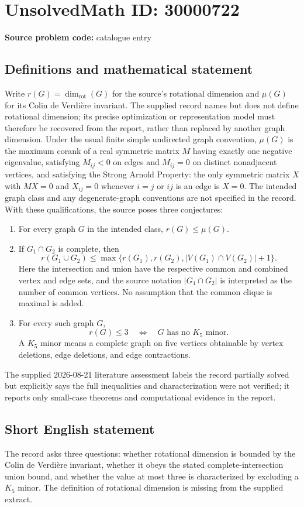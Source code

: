 \documentclass[11pt]{article}
\begin{document}
\section*{UnsolvedMath ID: 30000722}
\textbf{Source problem code:} catalogue entry
\subsection{Definitions and mathematical statement}
Write $r(G)=\operatorname{dim}_{\mathrm{rot}}(G)$ for the source's rotational dimension and $\mu(G)$ for its Colin de Verdi\`ere invariant. The supplied record names but does not define rotational dimension; its precise optimization or representation model must therefore be recovered from the report, rather than replaced by another graph dimension. Under the usual finite simple undirected graph convention, $\mu(G)$ is the maximum corank of a real symmetric matrix $M$ having exactly one negative eigenvalue, satisfying $M_{ij}<0$ on edges and $M_{ij}=0$ on distinct nonadjacent vertices, and satisfying the Strong Arnold Property: the only symmetric matrix $X$ with $MX=0$ and $X_{ij}=0$ whenever $i=j$ or $ij$ is an edge is $X=0$. The intended graph class and any degenerate-graph conventions are not specified in the record. With these qualifications, the source poses three conjectures: \begin{enumerate}\item For every graph $G$ in the intended class, $r(G)\leq\mu(G)$.\item If $G_1\cap G_2$ is complete, then \[r(G_1\cup G_2)\leq\max\{r(G_1),r(G_2),|V(G_1)\cap V(G_2)|+1\}.\] Here the intersection and union have the respective common and combined vertex and edge sets, and the source notation $|G_1\cap G_2|$ is interpreted as the number of common vertices. No assumption that the common clique is maximal is added.\item For every such graph $G$, \[r(G)\leq3\quad\Longleftrightarrow\quad G\text{ has no }K_5\text{ minor}.\] A $K_5$ minor means a complete graph on five vertices obtainable by vertex deletions, edge deletions, and edge contractions.\end{enumerate} The supplied 2026-08-21 literature assessment labels the record partially solved but explicitly says the full inequalities and characterization were not verified; it reports only small-case theorems and computational evidence in the report.
\subsection{Short English statement}
The record asks three questions: whether rotational dimension is bounded by the Colin de Verdi\`ere invariant, whether it obeys the stated complete-intersection union bound, and whether the value at most three is characterized by excluding a $K_5$ minor. The definition of rotational dimension is missing from the supplied extract.
\end{document}
